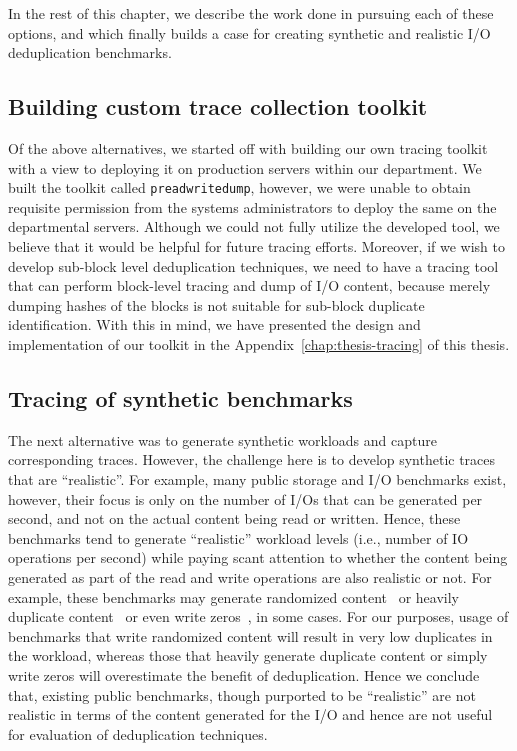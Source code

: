 In the rest of this chapter, we describe the work done 
in pursuing each of these options, and which finally 
builds a case for creating synthetic and realistic
I/O deduplication benchmarks.

\subsection{Building custom trace collection toolkit}
Of the above alternatives, we started off with building our own tracing 
toolkit with a view to deploying it on production servers within our
department. We built the toolkit called \texttt{preadwritedump}, however, 
we were unable to obtain requisite permission from the systems 
administrators to deploy the same on the departmental servers. Although
we could not fully utilize the developed tool, we believe that it would
be helpful for future tracing efforts. Moreover, if we wish to develop
sub-block level deduplication techniques, we need to have a tracing tool
that can perform block-level tracing and dump of I/O content, because 
merely dumping hashes of the blocks is not suitable for sub-block duplicate
identification. With this in mind, we have presented the design and 
implementation of our toolkit in the Appendix~\ref{chap:thesis-tracing}
of this thesis.

\subsection{Tracing of synthetic benchmarks}
The next alternative was to generate 
synthetic workloads and capture corresponding 
traces. However,
the challenge here is to develop synthetic traces that are ``realistic''. 
For example, many public storage and I/O benchmarks exist, however, their 
focus is only on the number of I/Os that can be
generated per second, and not on the actual content being read or written. 
Hence, these benchmarks tend to generate ``realistic'' workload levels (i.e., number of IO 
operations per second) while paying scant attention to
whether the content being generated as part of the read and write 
operations are also realistic or not.
For example, these benchmarks may generate randomized content~\cite{postmark}
or heavily duplicate content~\cite{rubis}
or even write zeros~\cite{zeros}, in some cases. 
For our purposes, usage of benchmarks that write randomized content
will result in very low duplicates in the workload, whereas those that heavily 
generate duplicate content or simply write zeros will overestimate the benefit of deduplication.
Hence we conclude that, existing public benchmarks, though purported 
to be ``realistic'' are not realistic in terms of the content generated
for the I/O and hence are not useful for evaluation of deduplication techniques.

